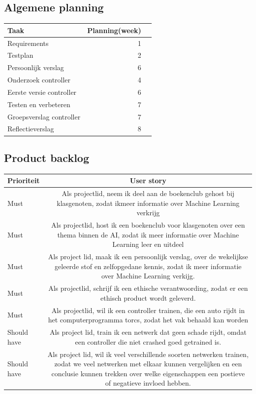 \documentclass{article}
\begin{document}
\subsection{Algemene planning}
\label{eerste-draft}
\begin{table}[h!]
\begin{tabularx}{\textwidth}{l r r}
 \textbf{Taak} & \textbf{Planning(week)}  \\ \hline
 Requirements & 1 \\
 Testplan & 2  \\
 Persoonlijk verslag & 6 \\
 Onderzoek controller & 4 \\
 Eerste versie controller & 6  \\
 Testen en verbeteren & 7  \\
 Groepsverslag controller & 7  \\
 Reflectieverslag & 8  \\
\end{tabularx}
\end{table}

\newpage

\subsection*{Product backlog}

\begin{table}[h]
\begin{tabularx}{\textwidth}{l C}
 \textbf{Prioriteit} & \textbf{User story}\\ \hline
 Must & Als projectlid, neem ik deel aan de boekenclub gehost bij klasgenoten, 
zodat ikmeer informatie over Machine Learning verkrijg\\ \hline
 Must & Als projectlid, host ik een boekenclub voor klasgenoten over een thema binnen de AI, zodat ik meer informatie over Machine Learning leer en uitdeel\\\hline
Must & Als project lid, maak ik een persoonlijk verslag, over de wekelijkse geleerde stof en zelfopgedane kennis, zodat ik meer informatie over Machine Learning verkijg.   \\\hline
 Must & Als projectlid, schrijf ik een ethische verantwoording, zodat er een ethisch product wordt geleverd.   \\\hline
 Must & Als projectlid, wil ik een controller trainen, die een auto rijdt in het computerprogramma torcs, zodat het vak behaald kan worden \\\hline
Should have & Als project lid, train ik een netwerk dat geen schade rijdt, omdat een controller die niet crashed goed getrained is. \\\hline
Should have & Als project lid, wil ik veel verschillende soorten netwerken trainen, zodat we veel netwerken met elkaar kunnen vergelijken en een conclusie kunnen trekken over welke eigenschappen een postieve of negatieve invloed hebben. \\
\end{tabularx}
\end{table} 
 
\end{document}
